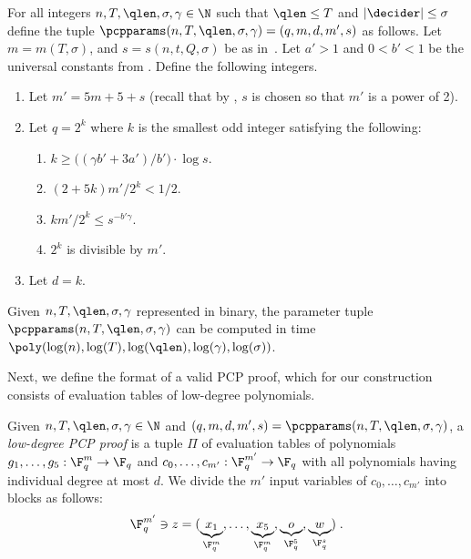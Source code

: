 \begin{definition}\label{def:pcpparams}
  For all integers $n, T, \qlen, \sigma, \gamma
  \in \N$ such that $\qlen \leq T$ and $|\decider|\leq \sigma$ define the tuple
  $\pcpparams(n,T,\qlen,\sigma,\gamma) = (q,m,d,m',s)$ as follows.
  Let $m=m(T,\sigma)$, and $s=s(n,t,Q,\sigma)$ be as
  in~.
  Let $a' > 1$ and $0 < b' < 1$ be the universal constants from
  .
  Define the following integers.
  \begin{enumerate}
	\item Let $m' = 5m + 5 + s$ (recall that by
          , $s$ is chosen
          so that $m'$ is a power of 2).
  \item Let $q = 2^k$ where $k$ is the smallest odd integer satisfying the following:
  \begin{enumerate}
  	\item $k \geq \Big ( (\gamma b' + 3a')/b' \Big ) \cdot \log s$.
	\item $(2 + 5k)m'/2^k < 1/2$.
	\item $km'/2^k \leq s^{-b' \gamma}$.
        \item $2^k$ is divisible by $m'$.
	\end{enumerate}
  \item Let $d = k$.

  \end{enumerate}
  Given $n, T, \qlen,\sigma,\gamma$ represented in binary, the parameter tuple
  $\pcpparams(n, T, \qlen, \sigma, \gamma)$ can be computed in time
  $\poly(\log(n), \log(T), \log(\qlen), \log (\gamma), \log(\sigma))$.
\end{definition}



Next, we define the format of a valid PCP proof, which for our construction
consists of evaluation tables of low-degree polynomials.

\begin{definition}\label{def:pcp-proof}
  Given $n, T, \qlen, \sigma, \gamma \in \N$ and $(q,m,d,m',s)=
  \pcpparams(n, T, \qlen, \sigma,\gamma)$, a \emph{low-degree PCP proof} is a tuple
  $\Pi$ of evaluation tables of polynomials $g_1, \dots, g_5: \F_q^{m} \to \F_q$
  and $c_0, \dots, c_{m'}: \F_q^{m'} \to \F_q$ with all polynomials having
  individual degree at most $d$.
  We divide the $m'$ input variables of $c_0, \dots, c_{m'}$ into blocks as
  follows:
  \[
    \F_q^{m'} \ni z = (\underbrace{x_1}_{\F_q^m}, \dots,
    \underbrace{x_5}_{\F_q^m}, \underbrace{o}_{\F_q^5},
    \underbrace{w}_{\F_q^s})\;.
  \]
\end{definition}


